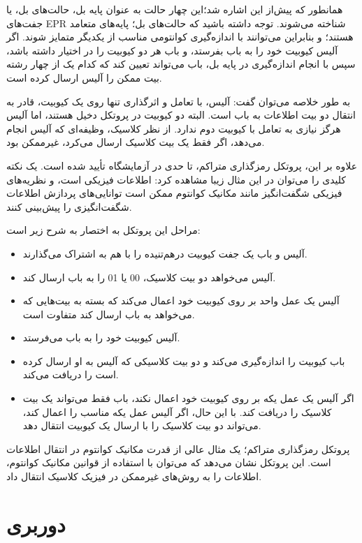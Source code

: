 \documentclass{book}
\begin{document}
همانطور که پیش‌از این اشاره شد؛این چهار حالت به عنوان پایه بل، حالت‌های بل، یا جفت‌های EPR شناخته می‌شوند.
 توجه داشته باشید که حالت‌های بل؛ پایه‌های متعامد هستند؛ و بنابراین می‌توانند با اندازه‌گیری کوانتومی مناسب از یکدیگر متمایز شوند. اگر آلیس کیوبیت خود را به باب بفرستد، و باب هر دو کیوبیت را در اختیار داشته باشد، سپس با انجام اندازه‌گیری در پایه بل، باب می‌تواند تعیین کند که کدام یک از چهار رشته بیت ممکن را آلیس ارسال کرده است.

به طور خلاصه می‌توان گفت:
 آلیس، با تعامل و اثرگذاری تنها روی یک کیوبیت، قادر به انتقال دو بیت اطلاعات به باب است. البته دو کیوبیت در پروتکل دخیل هستند، اما آلیس هرگز نیازی به تعامل با کیوبیت دوم ندارد. از نظر کلاسیک، وظیفه‌ای که آلیس انجام می‌دهد، اگر فقط یک بیت کلاسیک ارسال می‌کرد، غیرممکن بود.

علاوه بر این، پروتکل رمزگذاری متراکم، تا حدی در آزمایشگاه تأیید شده است.  یک نکته کلیدی را می‌توان در این مثال زیبا مشاهده کرد: اطلاعات فیزیکی است، و نظریه‌های فیزیکی شگفت‌انگیز مانند مکانیک کوانتوم ممکن است توانایی‌های پردازش اطلاعات شگفت‌انگیزی را پیش‌بینی کنند.

مراحل این پروتکل به اختصار به شرح زیر است:\\

\begin{itemize}
	\item آلیس و باب یک جفت کیوبیت درهم‌تنیده را با هم به اشتراک می‌گذارند.
	\item آلیس می‌خواهد دو بیت کلاسیک، 00 یا 01 را به باب ارسال کند.
	\item آلیس یک عمل واحد بر روی کیوبیت خود اعمال می‌کند که بسته به بیت‌هایی که می‌خواهد به باب ارسال کند متفاوت است.
	\item آلیس کیوبیت خود را به باب می‌فرستد.
	\item باب کیوبیت را اندازه‌گیری می‌کند و دو بیت کلاسیکی که آلیس به او ارسال کرده است را دریافت می‌کند.
	\item اگر آلیس یک عمل یکه بر روی کیوبیت خود اعمال نکند، باب فقط می‌تواند یک بیت کلاسیک را دریافت کند. با این حال، اگر آلیس عمل یکه مناسب را اعمال کند، می‌تواند دو بیت کلاسیک را با ارسال یک کیوبیت انتقال دهد.
\end{itemize}

پروتکل رمزگذاری متراکم؛ یک مثال عالی از قدرت مکانیک کوانتوم در انتقال اطلاعات است. این پروتکل نشان می‌دهد که می‌توان با استفاده از قوانین مکانیک کوانتوم، اطلاعات را به روش‌های غیرممکن در فیزیک کلاسیک انتقال داد.
\newpage
\section{دوربری}
\end{document}
